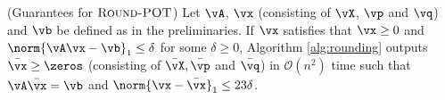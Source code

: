 \begin{theorem}
    (Guarantees for $\textsc{Round-POT}$)
    \label{prop:rounding}
    Let $\vA$, $\vx$ (consisting of $\vX$, $\vp$ and $\vq$) and $\vb$ be defined as in the preliminaries. If $\vx$ satisfies that $\vx \geq 0$ and $\norm{\vA \vx - \vb}_1 \leq \delta$ for some $\delta \geq 0$, Algorithm \ref{alg:rounding} outputs $\Bar{\vx} \geq \zeros$ (consisting of $\Bar{\vX}, \Bar{\vp}$ and $\Bar{\vq}$) in $\mathcal{O}(n^2)$ time such that $\vA \Bar{\vx} = \vb$ and $\norm{\vx - \Bar{\vx}}_1 \leq 23 \delta$.
\end{theorem}
